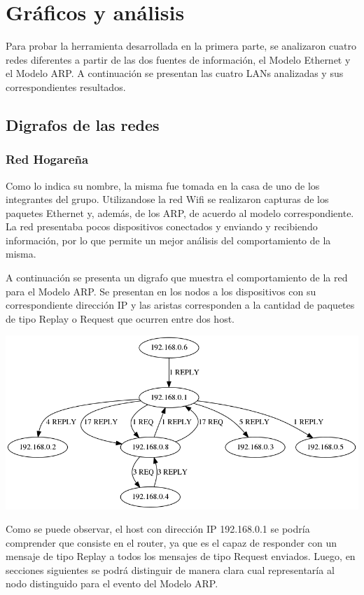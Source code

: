 \section{Gráficos y análisis}
Para probar la herramienta desarrollada en la primera parte, se analizaron cuatro redes diferentes a partir de las dos fuentes de información, el Modelo Ethernet y el Modelo ARP. 
A continuación se presentan las cuatro LANs analizadas y sus correspondientes resultados. 

\subsection{Digrafos de las redes}

\subsubsection{Red Hogareña}
Como lo indica su nombre, la misma fue tomada en la casa de uno de los integrantes del grupo. Utilizandose la red Wifi se realizaron capturas de los paquetes Ethernet y, además, de los ARP, de acuerdo al modelo correspondiente. La red presentaba pocos dispositivos conectados y enviando y recibiendo información, por lo que permite un mejor análisis del comportamiento de la misma. 

A continuación se presenta un digrafo que muestra el comportamiento de la red para el Modelo ARP. Se presentan en los nodos a los dispositivos con su correspondiente dirección IP y las aristas corresponden a la cantidad de paquetes de tipo Replay o Request que ocurren entre dos host. 


\centerline{\includegraphics[width=1\textwidth]{./graficos/grafos-arp/grafo_casa_mari.png}}


Como se puede observar, el host con dirección IP 192.168.0.1 se podría comprender que consiste en el router, ya que es el capaz de responder con un mensaje de tipo Replay a todos los mensajes de tipo Request enviados. Luego, en secciones siguientes se podrá distinguir de manera clara cual representaría al nodo distinguido para el evento del Modelo ARP. 

